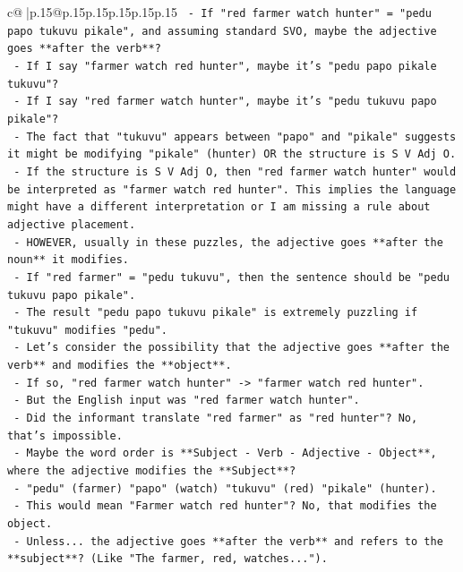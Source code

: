 \documentclass{article}
\begin{document}
{\begin{supertabular}{c@{$\;$}|p{.15\linewidth}@{}p{.15\linewidth}p{.15\linewidth}p{.15\linewidth}p{.15\linewidth}p{.15\linewidth}}
{{{\texttt{       {-} If "red farmer watch hunter" = "pedu papo tukuvu pikale", and assuming standard SVO, maybe the adjective goes **after the verb**?} \\
\texttt{       {-} If I say "farmer watch red hunter", maybe it's "pedu papo pikale tukuvu"?} \\
\texttt{       {-} If I say "red farmer watch hunter", maybe it's "pedu tukuvu papo pikale"?} \\
\texttt{       {-} The fact that "tukuvu" appears between "papo" and "pikale" suggests it might be modifying "pikale" (hunter) OR the structure is S V Adj O.} \\
\texttt{       {-} If the structure is S V Adj O, then "red farmer watch hunter" would be interpreted as "farmer watch red hunter". This implies the language might have a different interpretation or I am missing a rule about adjective placement.} \\
\texttt{       {-} HOWEVER, usually in these puzzles, the adjective goes **after the noun** it modifies.} \\
\texttt{       {-} If "red farmer" = "pedu tukuvu", then the sentence should be "pedu tukuvu papo pikale".} \\
\texttt{       {-} The result "pedu papo tukuvu pikale" is extremely puzzling if "tukuvu" modifies "pedu".} \\
\texttt{       {-} Let's consider the possibility that the adjective goes **after the verb** and modifies the **object**.} \\
\texttt{         {-} If so, "red farmer watch hunter" {-}> "farmer watch red hunter".} \\
\texttt{         {-} But the English input was "red farmer watch hunter".} \\
\texttt{         {-} Did the informant translate "red farmer" as "red hunter"? No, that's impossible.} \\
\texttt{         {-} Maybe the word order is **Subject {-} Verb {-} Adjective {-} Object**, where the adjective modifies the **Subject**?} \\
\texttt{           {-} "pedu" (farmer) "papo" (watch) "tukuvu" (red) "pikale" (hunter).} \\
\texttt{           {-} This would mean "Farmer watch red hunter"? No, that modifies the object.} \\
\texttt{           {-} Unless... the adjective goes **after the verb** and refers to the **subject**? (Like "The farmer, red, watches...").} \\
}}}
\end{supertabular}}
\end{document}
